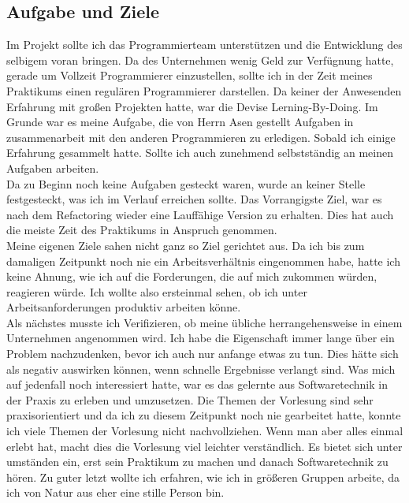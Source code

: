 \subsection{Aufgabe und Ziele}

Im Projekt sollte ich das Programmierteam unterstützen und die Entwicklung des selbigem voran bringen. Da des Unternehmen wenig Geld zur Verfügnung hatte, gerade um Vollzeit Programmierer einzustellen, sollte ich in der Zeit meines Praktikums einen regulären Programmierer darstellen. Da keiner der Anwesenden Erfahrung mit großen Projekten hatte, war die Devise Lerning-By-Doing. Im Grunde war es meine Aufgabe, die von Herrn Asen gestellt Aufgaben in zusammenarbeit mit den anderen Programmieren zu erledigen. Sobald ich einige Erfahrung gesammelt hatte. Sollte ich auch zunehmend selbstständig an meinen Aufgaben arbeiten.\\
Da zu Beginn noch keine Aufgaben gesteckt waren, wurde an keiner Stelle festgesteckt, was ich im Verlauf erreichen sollte. Das Vorrangigste Ziel, war es nach dem Refactoring wieder eine Lauffähige Version zu erhalten. Dies hat auch die meiste Zeit des Praktikums in Anspruch genommen.\\

Meine eigenen Ziele sahen nicht ganz so Ziel gerichtet aus. Da ich bis zum damaligen Zeitpunkt noch nie ein Arbeitsverhältnis eingenommen habe, hatte ich keine Ahnung, wie ich auf die Forderungen, die auf mich zukommen würden, reagieren würde. Ich wollte also ersteinmal sehen, ob ich unter Arbeitsanforderungen produktiv arbeiten könne.\\
Als nächstes musste ich Verifizieren, ob meine übliche herrangehensweise in einem Unternehmen angenommen wird. Ich habe die Eigenschaft immer lange über ein Problem nachzudenken, bevor ich auch nur anfange etwas zu tun. Dies hätte sich als negativ auswirken können, wenn schnelle Ergebnisse verlangt sind. Was mich auf jedenfall noch interessiert hatte, war es das gelernte aus Softwaretechnik in der Praxis zu erleben und umzusetzen. Die Themen der Vorlesung sind sehr praxisorientiert und da ich zu diesem Zeitpunkt noch nie gearbeitet hatte, konnte ich viele Themen der Vorlesung nicht nachvollziehen. Wenn man aber alles einmal erlebt hat, macht dies die Vorlesung viel leichter verständlich. Es bietet sich unter umständen ein, erst sein Praktikum zu machen und danach Softwaretechnik zu hören. Zu guter letzt wollte ich erfahren, wie ich in größeren Gruppen arbeite, da ich von Natur aus eher eine stille Person bin.

